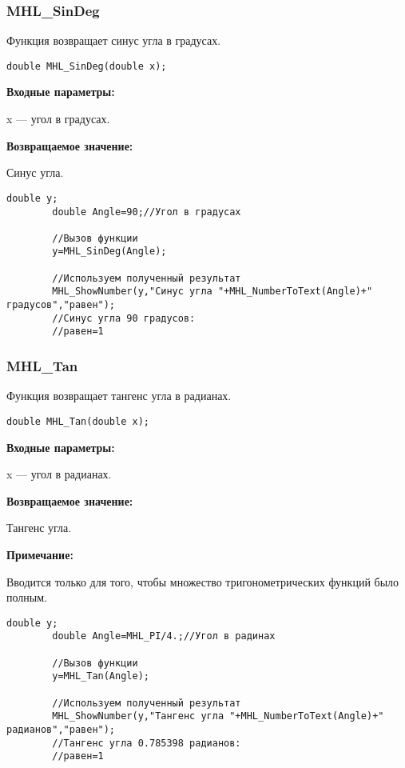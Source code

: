 \documentclass[a4paper,12pt]{article}
\begin{document}
\subsubsection{MHL\_SinDeg}\label{MHL_SinDeg}

Функция возвращает синус угла в градусах.


\begin{lstlisting}[label=code_syntax_MHL_SinDeg,caption=Синтаксис]
double MHL_SinDeg(double x);
\end{lstlisting}

\textbf{Входные параметры:}

 x --- угол в градусах.

\textbf{Возвращаемое значение:}

Синус угла.


\begin{lstlisting}[label=code_use_MHL_SinDeg,caption=Пример использования]
        double y;
        double Angle=90;//Угол в градусах

        //Вызов функции
        y=MHL_SinDeg(Angle);

        //Используем полученный результат
        MHL_ShowNumber(y,"Синус угла "+MHL_NumberToText(Angle)+" градусов","равен");
        //Синус угла 90 градусов:
        //равен=1
\end{lstlisting}

\subsubsection{MHL\_Tan}\label{MHL_Tan}

Функция возвращает тангенс угла в радианах.


\begin{lstlisting}[label=code_syntax_MHL_Tan,caption=Синтаксис]
double MHL_Tan(double x);
\end{lstlisting}

\textbf{Входные параметры:}

 x --- угол в радианах.

\textbf{Возвращаемое значение:}

Тангенс угла.

\textbf{Примечание:}

 Вводится только для того, чтобы множество тригонометрических функций было полным.


\begin{lstlisting}[label=code_use_MHL_Tan,caption=Пример использования]
        double y;
        double Angle=MHL_PI/4.;//Угол в радинах

        //Вызов функции
        y=MHL_Tan(Angle);

        //Используем полученный результат
        MHL_ShowNumber(y,"Тангенс угла "+MHL_NumberToText(Angle)+" радианов","равен");
        //Тангенс угла 0.785398 радианов:
        //равен=1
\end{lstlisting}
\end{document}
